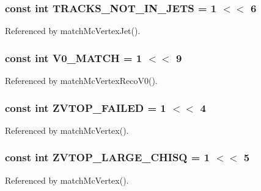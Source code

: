 \subsubsection[{T\-R\-A\-C\-K\-S\-\_\-\-N\-O\-T\-\_\-\-I\-N\-\_\-\-J\-E\-T\-S}]{\setlength{\rightskip}{0pt plus 5cm}const int T\-R\-A\-C\-K\-S\-\_\-\-N\-O\-T\-\_\-\-I\-N\-\_\-\-J\-E\-T\-S = 1 $<$$<$ 6}\label{Driver_8cc_adda5c5fd1621f4ce3895a201c12bc1c3}


Referenced by match\-Mc\-Vertex\-Jet().

\subsubsection[{V0\-\_\-\-M\-A\-T\-C\-H}]{\setlength{\rightskip}{0pt plus 5cm}const int V0\-\_\-\-M\-A\-T\-C\-H = 1 $<$$<$ 9}\label{Driver_8cc_a1c3b49796c87dd40f70e5812f5fedd7f}


Referenced by match\-Mc\-Vertex\-Reco\-V0().

\subsubsection[{Z\-V\-T\-O\-P\-\_\-\-F\-A\-I\-L\-E\-D}]{\setlength{\rightskip}{0pt plus 5cm}const int Z\-V\-T\-O\-P\-\_\-\-F\-A\-I\-L\-E\-D = 1 $<$$<$ 4}\label{Driver_8cc_a395f85d6d47b659be80c91fc396a6732}


Referenced by match\-Mc\-Vertex().

\subsubsection[{Z\-V\-T\-O\-P\-\_\-\-L\-A\-R\-G\-E\-\_\-\-C\-H\-I\-S\-Q}]{\setlength{\rightskip}{0pt plus 5cm}const int Z\-V\-T\-O\-P\-\_\-\-L\-A\-R\-G\-E\-\_\-\-C\-H\-I\-S\-Q = 1 $<$$<$ 5}\label{Driver_8cc_a0e782b3a205abe3be0affc366dc989ba}


Referenced by match\-Mc\-Vertex().


